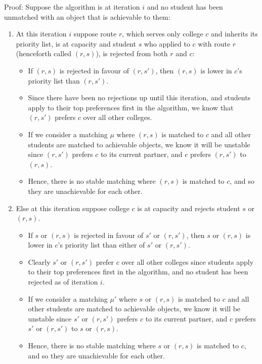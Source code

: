 \documentclass{article}
\begin{document}
Proof: Suppose the algorithm is at iteration $i$ and no student has been unmatched with an object that is achievable to them:
\begin{enumerate}
    \item At this iteration $i$ suppose route $r$, which serves only college $c$ and inherits its priority list, is at capacity and student $s$ who applied to $c$ with route $r$ (henceforth called $(r,s)$), is rejected from both $r$ and $c$:
    \begin{itemize}
        \item If $(r,s)$ is rejected in favour of $(r,s')$, then $(r,s)$ is lower in $c$'s priority list than $(r,s')$.
        \item Since there have been no rejections up until this iteration, and students apply to their top preferences first in the algorithm, we know that $(r,s')$ prefers $c$ over all other colleges.
        \item If we consider a matching $\mu$ where $(r,s)$ is matched to $c$ and all other students are matched to achievable objects, we know it will be unstable since $(r,s')$ prefers $c$ to its current partner, and $c$ prefers $(r,s')$ to $(r,s)$.
        \item Hence, there is no stable matching where $(r,s)$ is matched to $c$, and so they are unachievable for each other.
    \end{itemize}
    \item Else at this iteration suppose college $c$ is at capacity and rejects student $s$ or $(r,s)$.
    \begin{itemize}
        \item If $s$ or $(r,s)$ is rejected in favour of $s'$ or $(r,s')$, then $s$ or $(r,s)$ is lower in $c$'s priority list than either of $s'$ or $(r,s')$.
        \item Clearly $s'$ or $(r,s')$ prefer $c$ over all other colleges since students apply to their top preferences first in the algorithm, and no student has been rejected as of iteration $i$.
        \item If we consider a matching $\mu'$ where $s$ or $(r,s)$ is matched to $c$ and all other students are matched to achievable objects, we know it will be unstable since $s'$ or $(r,s')$ prefers $c$ to its current partner, and $c$ prefers $s'$ or $(r,s')$ to $s$ or $(r,s)$.
        \item Hence, there is no stable matching where $s$ or $(r,s)$ is matched to $c$, and so they are unachievable for each other.
    \end{itemize}
\end{enumerate}
\end{document}
